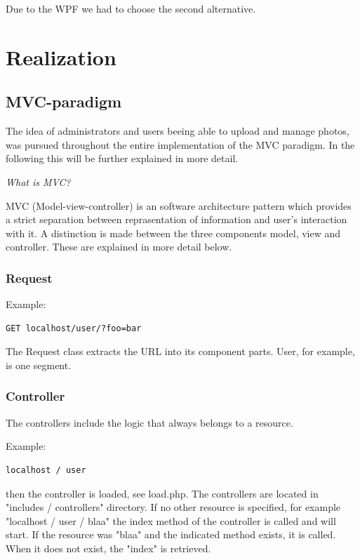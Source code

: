 \documentclass[a4paper,12pt,oneside]{article} %
\begin{document}
Due to the WPF we had to choose the second alternative.

\newpage

\section{Realization}


\subsection{MVC-paradigm}

The idea of administrators and users beeing able to upload and manage photos,
was pursued throughout the entire implementation of the MVC paradigm.
In the following this will be further explained in more detail.

\emph{What is MVC?}

MVC (Model-view-controller) is an software architecture pattern which provides a
strict separation between reprasentation of information and user's interaction with it.
A distinction is made between the three components model, view and controller. These
are explained in more detail below.


\subsubsection*{Request}

Example:
\begin{lstlisting}
GET localhost/user/?foo=bar
\end{lstlisting}

The Request class extracts the URL into its component parts. User,
for example, is one segment.


\subsubsection*{Controller}

The controllers include the logic that always belongs to a resource.

Example:

\begin{lstlisting}
localhost / user
\end{lstlisting}
then the controller is loaded, see load.php. The controllers are
located in "includes / controllers" directory. If no other resource
is specified, for example "localhost / user / blaa"
the index method of the controller is called and will start. If the resource was
"blaa" and the indicated method exists, it is called. When it does not
exist, the "index" is retrieved.
\end{document}
